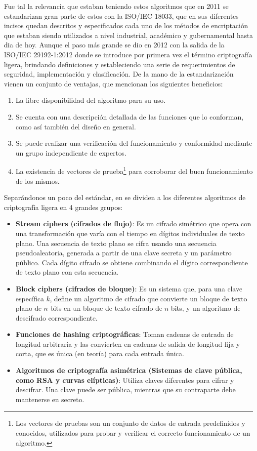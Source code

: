 \documentclass[]{article}
\begin{document}
Fue tal la relevancia que estaban teniendo estos algoritmos que en 2011 se estandarizan gran parte de estos con la ISO/IEC 18033, que en sus diferentes incisos quedan descritos y especificados cada uno de los métodos de encriptación que estaban siendo utilizados a nivel industrial, académico y gubernamental hasta dia de hoy. Aunque el paso más grande se dio en 2012 con la salida de la ISO/IEC 29192-1:2012 donde se introduce por primera vez el término criptografía ligera, brindando definiciones y estableciendo una serie de requerimientos de seguridad, implementación y clasificación. De la mano de la estandarización vienen un conjunto de ventajas, que \parencite{eterovic15stream} mencionan los siguientes beneficios:
\begin{enumerate}
	\item La libre disponibilidad del algoritmo para su uso.
	\item Se cuenta con una descripción detallada de las funciones que lo conforman, como así también del diseño en general.
	\item Se puede realizar una verificación del funcionamiento y conformidad mediante un grupo independiente de expertos.
	\item La existencia de vectores de prueba\footnote{Los vectores de pruebas son un conjunto de datos de entrada predefinidos y conocidos, utilizados para probar y verificar el correcto funcionamiento de un algoritmo.} para corroborar del buen funcionamiento de los mismos.
\end{enumerate}
Separándonos un poco del estándar, en \parencite{wehbe2022criptografia} se dividen a los diferentes algoritmos de criptografía ligera en 4 grandes grupos:
\begin{itemize}
	\item \textbf{Stream ciphers (cifrados de flujo)}: Es un cifrado simétrico que opera con una transformación que varía con el tiempo en dígitos individuales de texto plano. Una secuencia de texto plano se cifra usando una secuencia pseudoaleatoria, generada a partir de una clave secreta y un parámetro público. Cada dígito cifrado se obtiene combinando el dígito correspondiente de texto plano con esta secuencia.
	\item \textbf{Block ciphers (cifrados de bloque)}: Es un sistema que, para una clave específica $k$, define un algoritmo de cifrado que convierte un bloque de texto plano de $n$ bits en un bloque de texto cifrado de $n$ bits, y un algoritmo de descifrado correspondiente.
	\item \textbf{Funciones de hashing criptográficas}: Toman cadenas de entrada de longitud arbitraria y las convierten en cadenas de salida de longitud fija y corta, que es única (en teoría) para cada entrada única.
	\item \textbf{Algoritmos de criptografía asimétrica (Sistemas de clave pública, como RSA y curvas elípticas)}: Utiliza claves diferentes para cifrar y descifrar. Una clave puede ser pública, mientras que su contraparte debe mantenerse en secreto.
\end{itemize}
\end{document}

